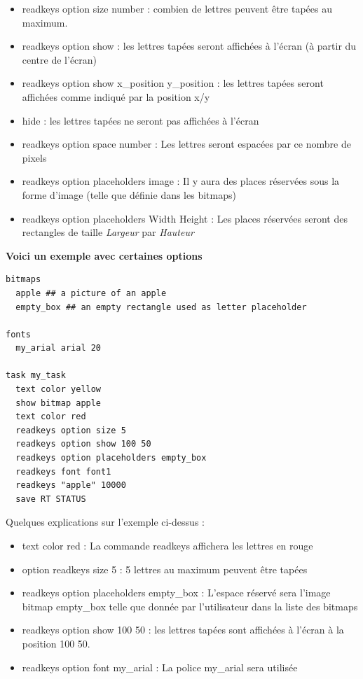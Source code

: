 \documentclass[
]{book}
\providecommand{\tightlist}{%
  \setlength{\itemsep}{0pt}\setlength{\parskip}{0pt}}
\begin{document}
\begin{itemize}
\tightlist
\item
  readkeys option size number : combien de lettres peuvent être tapées
  au maximum.
\item
  readkeys option show : les lettres tapées seront affichées à l'écran
  (à partir du centre de l'écran)
\item
  readkeys option show x\_position y\_position : les lettres tapées
  seront affichées comme indiqué par la position x/y
\item
  hide : les lettres tapées ne seront pas affichées à l'écran
\item
  readkeys option space number : Les lettres seront espacées par ce
  nombre de pixels
\item
  readkeys option placeholders image : Il y aura des places réservées
  sous la forme d'image (telle que définie dans les bitmaps)
\item
  readkeys option placeholders Width Height : Les places réservées
  seront des rectangles de taille \emph{Largeur} par \emph{Hauteur}
\end{itemize}

\textbf{Voici un exemple avec certaines options}

\begin{verbatim}
bitmaps
  apple ## a picture of an apple
  empty_box ## an empty rectangle used as letter placeholder

fonts
  my_arial arial 20

task my_task
  text color yellow
  show bitmap apple
  text color red
  readkeys option size 5
  readkeys option show 100 50
  readkeys option placeholders empty_box
  readkeys font font1
  readkeys "apple" 10000
  save RT STATUS
\end{verbatim}

Quelques explications sur l'exemple ci-dessus :

\begin{itemize}
\tightlist
\item
  text color red : La commande readkeys affichera les lettres en rouge
\item
  option readkeys size 5 : 5 lettres au maximum peuvent être tapées
\item
  readkeys option placeholders empty\_box : L'espace réservé sera
  l'image bitmap empty\_box telle que donnée par l'utilisateur dans la
  liste des bitmaps
\item
  readkeys option show 100 50 : les lettres tapées sont affichées à
  l'écran à la position 100 50.
\item
  readkeys option font my\_arial : La police my\_arial sera utilisée
\end{itemize}
\end{document}

